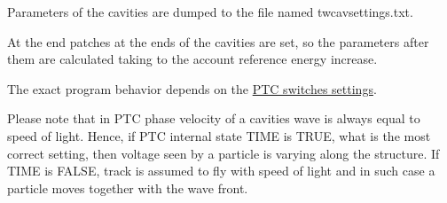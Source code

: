  Parameters of the cavities are dumped to the file named twcavsettings.txt.   

 At the end patches at the ends of the cavities are set,  so the parameters after them are  calculated taking to the account reference energy increase.  

 The exact program behavior depends on the  \href{PTC_SetSwitch.html}{ PTC switches settings}.  

 Please note that in PTC phase velocity of a cavities wave is always equal to speed of light.  Hence, if PTC internal state TIME is TRUE, what is the most correct setting,  then voltage seen by a particle is varying along the structure. If TIME is FALSE,  track is assumed to fly with speed of light and in such case a particle moves together with the wave front.   

